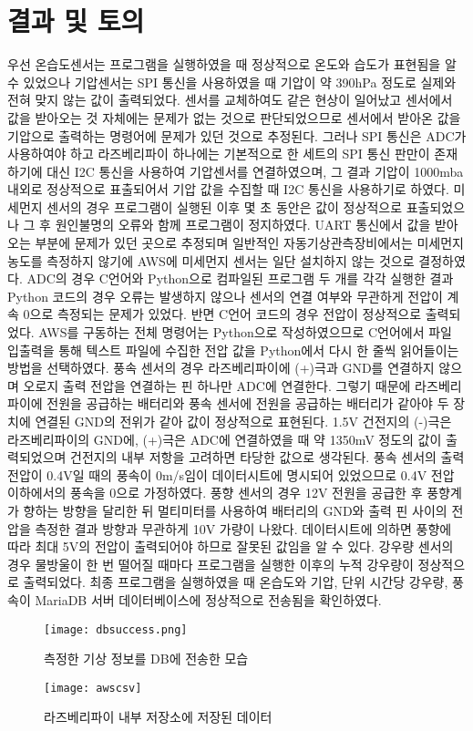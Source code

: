 \section{결과 및 토의}

우선 온습도센서는 프로그램을 실행하였을 때 정상적으로 온도와 습도가 표현됨을 알 수 있었으나 기압센서는 SPI 통신을 사용하였을 때 기압이 약 390hPa 정도로 실제와 전혀 맞지 않는 값이 출력되었다. 센서를 교체하여도 같은 현상이 일어났고 센서에서 값을 받아오는 것 자체에는 문제가 없는 것으로 판단되었으므로 센서에서 받아온 값을 기압으로 출력하는 명령어에 문제가 있던 것으로 추정된다. 그러나 SPI 통신은 ADC가 사용하여야 하고 라즈베리파이 하나에는 기본적으로 한 세트의 SPI 통신 판만이 존재하기에 대신 I2C 통신을 사용하여 기압센서를 연결하였으며, 그 결과 기압이 1000mba 내외로 정상적으로 표출되어서 기압 값을 수집할 때 I2C 통신을 사용하기로 하였다. 미세먼지 센서의 경우 프로그램이 실행된 이후 몇 초 동안은 값이 정상적으로 표출되었으나 그 후 원인불명의 오류와 함께 프로그램이 정지하였다. UART 통신에서 값을 받아오는 부분에 문제가 있던 곳으로 추정되며 일반적인 자동기상관측장비에서는 미세먼지 농도를 측정하지 않기에 AWS에 미세먼지 센서는 일단 설치하지 않는 것으로 결정하였다. ADC의 경우 C언어와 Python으로 컴파일된 프로그램 두 개를 각각 실행한 결과 Python 코드의 경우 오류는 발생하지 않으나 센서의 연결 여부와 무관하게 전압이 계속 0으로 측정되는 문제가 있었다. 반면 C언어 코드의 경우 전압이 정상적으로 출력되었다. AWS를 구동하는 전체 명령어는 Python으로 작성하였으므로 C언어에서 파일 입출력을 통해 텍스트 파일에 수집한 전압 값을 Python에서 다시 한 줄씩 읽어들이는 방법을 선택하였다. 풍속 센서의 경우 라즈베리파이에 (+)극과 GND를 연결하지 않으며 오로지 출력 전압을 연결하는 핀 하나만 ADC에 연결한다. 그렇기 때문에 라즈베리파이에 전원을 공급하는 배터리와 풍속 센서에 전원을 공급하는 배터리가 같아야 두 장치에 연결된 GND의 전위가 같아 값이 정상적으로 표현된다. 1.5V 건전지의 (-)극은 라즈베리파이의 GND에, (+)극은 ADC에 연결하였을 때 약 1350mV 정도의 값이 출력되었으며 건전지의 내부 저항을 고려하면 타당한 값으로 생각된다. 풍속 센서의 출력 전압이 0.4V일 때의 풍속이 0m/s임이 데이터시트에 명시되어 있었으므로 0.4V 전압 이하에서의 풍속을 0으로 가정하였다. 풍향 센서의 경우 12V 전원을 공급한 후 풍향계가 향하는 방향을 달리한 뒤 멀티미터를 사용하여 배터리의 GND와 출력 핀 사이의 전압을 측정한 결과 방향과 무관하게 10V 가량이 나왔다. 데이터시트에 의하면 풍향에 따라 최대 5V의 전압이 출력되어야 하므로 잘못된 값임을 알 수 있다. 강우량 센서의 경우 물방울이 한 번 떨어질 때마다 프로그램을 실행한 이후의 누적 강우량이 정상적으로 출력되었다. 최종 프로그램을 실행하였을 때 온습도와 기압, 단위 시간당 강우량, 풍속이 MariaDB 서버 데이터베이스에 정상적으로 전송됨을 확인하였다.

\begin{figure}[htbp]
	\centering
	\texttt{[image: dbsuccess.png]}
	\caption{측정한 기상 정보를 DB에 전송한 모습}
	\label{DBSENT}
\end{figure}

\begin{figure}[htbp]
	\centering
	\texttt{[image: awscsv]}
	\caption{라즈베리파이 내부 저장소에 저장된 데이터}
	\label{AWSCSV}
\end{figure}